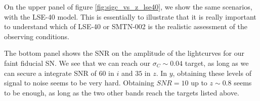 \documentclass[\docopts]{\docclass}
\begin{document}
On the upper panel of figure \ref{fig:sigc_vs_z_lse40}, we show the
same scenarios, with the LSE-40 model.  This is essentially to
illustrate that it is really important to understand which of
LSE-40 or SMTN-002 is the realistic assessment of the observing
conditions.

The bottom panel shows the SNR on the amplitude of the lightcurves for
our faint fiducial SN. We see that we can reach our $\sigma_C \sim
0.04$ target, as long as we can secure a integrate SNR of 60 in $i$
and $35$ in $z$.  In $y$, obtaining these levels of signal to noise
seems to be very hard. Obtaining $SNR=10$ up to $z\sim 0.8$ seems to
be enough, as long as the two other bands reach the targets listed
above.


\end{document}
